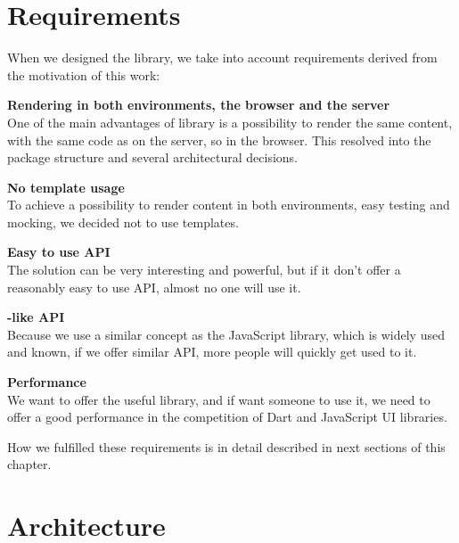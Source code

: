 \documentclass[oneside, 12pt]{book}
\begin{document}
\section{Requirements}\label{subsec:our-architecture-requirements}

  When we designed the \tiles library, we take into account requirements derived from the motivation of this work:

  \begin{description}
    \item{\textbf{Rendering in both environments, the browser and the server}} \hfill \\
			One of the main advantages of \tiles library is a possibility to render the same content, 
      with the same code as on the server, so in the browser.
      This resolved into the package structure and several architectural decisions.
      \begin{description}
        \item{\textbf{No template usage}} \hfill \\
          To achieve a possibility to render content in both environments, easy testing and mocking, 
          we decided not to use templates.
      \end{description}
    \item{\textbf{Easy to use API}} \hfill \\
      The solution can be very interesting and powerful, 
      but if it don't offer a reasonably easy to use API, almost no one will use it.
      \begin{description}
				\item{\textbf{\react-like API}} \hfill \\
					Because we use a similar concept as the JavaScript \react library,  
          which is widely used and known, 
          if we offer similar API, more people will quickly get used to it.
      \end{description}
    \item{\textbf{Performance}} \hfill \\
      We want to offer the useful library, and if want someone to use it, 
      we need to offer a good performance in the competition of Dart and JavaScript UI libraries.
  \end{description}

  How we fulfilled these requirements is in detail described in next sections of this chapter.

\section{Architecture}\label{sec:our-architecture}
\end{document}
